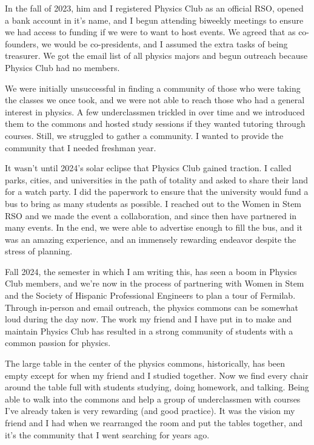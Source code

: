 \documentclass[11pt]{article}
\begin{document}
In the fall of 2023, him and I registered Physics Club as an official RSO, opened a bank account in it's name, and I begun attending biweekly meetings to ensure we had access to funding if we were to want to host events. We agreed that as co-founders, we would be co-presidents, and I assumed the extra tasks of being treasurer. We got the email list of all physics majors and begun outreach because Physics Club had no members.

We were initially unsuccessful in finding a community of those who were taking the classes we once took, and we were not able to reach those who had a general interest in physics. A few underclassmen trickled in over time and we introduced them to the commons and hosted study sessions if they wanted tutoring through courses. Still, we struggled to gather a community. I wanted to provide the community that I needed freshman year.

It wasn't until 2024's solar eclipse that Physics Club gained traction. I called parks, cities, and universities in the path of totality and asked to share their land for a watch party. I did the paperwork to ensure that the university would fund a bus to bring as many students as possible. I reached out to the Women in Stem RSO and we made the event a collaboration, and since then have partnered in many events. In the end, we were able to advertise enough to fill the bus, and it was an amazing experience, and an immensely rewarding endeavor despite the stress of planning.

Fall 2024, the semester in which I am writing this, has seen a boom in Physics Club members, and we're now in the process of partnering with Women in Stem and the Society of Hispanic Professional Engineers to plan a tour of Fermilab. Through in-person and email outreach, the physics commons can be somewhat loud during the day now. The work my friend and I have put in to make and maintain Physics Club has resulted in a strong community of students with a common passion for physics.

The large table in the center of the physics commons, historically, has been empty except for when my friend and I studied together. Now we find every chair around the table full with students studying, doing homework, and talking. Being able to walk into the commons and help a group of underclassmen with courses I've already taken is very rewarding (and good practice). It was the vision my friend and I had when we rearranged the room and put the tables together, and it's the community that I went searching for years ago.
\end{document}
